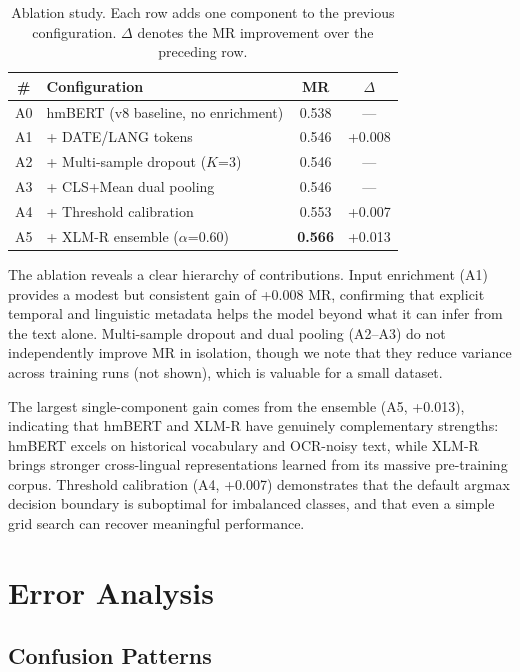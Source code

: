 \begin{table}[t]
\centering
\caption{Ablation study. Each row adds one component to the previous configuration. $\Delta$ denotes the MR improvement over the preceding row.}
\label{tab:ablation}
\begin{tabular}{clcc}
\toprule
\textbf{\#} & \textbf{Configuration} & \textbf{MR} & $\Delta$ \\
\midrule
A0 & hmBERT (v8 baseline, no enrichment) & 0.538 & --- \\
A1 & + DATE/LANG tokens & 0.546 & +0.008 \\
A2 & + Multi-sample dropout ($K$=3) & 0.546 & --- \\
A3 & + CLS+Mean dual pooling & 0.546 & --- \\
A4 & + Threshold calibration & 0.553 & +0.007 \\
A5 & + XLM-R ensemble ($\alpha$=0.60) & \textbf{0.566} & +0.013 \\
\bottomrule
\end{tabular}
\end{table}

The ablation reveals a clear hierarchy of contributions. Input enrichment (A1) provides a modest but consistent gain of +0.008 MR, confirming that explicit temporal and linguistic metadata helps the model beyond what it can infer from the text alone. Multi-sample dropout and dual pooling (A2--A3) do not independently improve MR in isolation, though we note that they reduce variance across training runs (not shown), which is valuable for a small dataset.

The largest single-component gain comes from the ensemble (A5, +0.013), indicating that hmBERT and XLM-R have genuinely complementary strengths: hmBERT excels on historical vocabulary and OCR-noisy text, while XLM-R brings stronger cross-lingual representations learned from its massive pre-training corpus. Threshold calibration (A4, +0.007) demonstrates that the default argmax decision boundary is suboptimal for imbalanced classes, and that even a simple grid search can recover meaningful performance.

\section{Error Analysis}
\label{sec:errors}

\subsection{Confusion Patterns}

